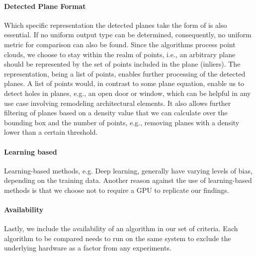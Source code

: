 \documentclass[main.tex]{subfiles}
\begin{document}
\paragraph{Detected Plane Format} \label{subsec:planeformat}
Which specific representation the detected planes take the form of is also essential.
If no uniform output type can be determined, consequently, no uniform metric for comparison can also be found.
Since the algorithms process point clouds, we choose to stay within the realm of points, i.e., an arbitrary plane should be
represented by the set of points included in the plane (inliers).
The representation, being a list of points, enables further processing of the detected planes.
A list of points would, in contrast to some plane equation, enable us to detect holes in planes, e.g.,
an open door or window, which can be helpful in any use case involving remodeling architectural elements.
It also allows further filtering of planes based on a density value that we can calculate over the bounding
box and the number of points, e.g., removing planes with a density lower than a certain threshold.


\paragraph{Learning based}\label{subsec_learning_based}
Learning-based methods, e.g. Deep learning, generally have varying levels of bias, depending on the training data.
Another reason against the use of learning-based methods is that we choose not to require a GPU to replicate our findings.


\paragraph{Availability}
Lastly, we include the availability of an algorithm in our set of criteria.
Each algorithm to be compared needs to run on the same system to exclude the underlying hardware as a factor from any experiments.\\
\end{document}
